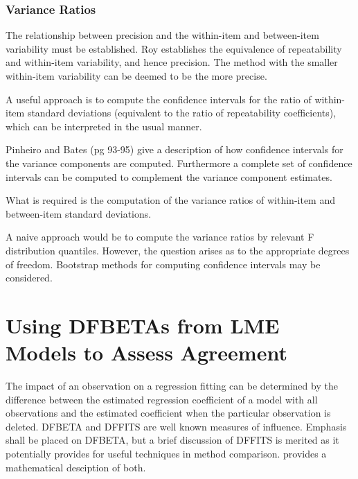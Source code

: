 \documentclass[12pt, a4paper]{report}
\theoremstyle{plain}
\theoremstyle{definition}
\theoremstyle{remark}
\begin{document}
	
	
	
	\subsubsection{Variance Ratios}
	
	The relationship between precision and the within-item and between-item variability must be established. Roy establishes the equivalence of repeatability and within-item variability, and hence precision.  The method with the smaller within-item variability can be deemed to be the more precise.
	
	A useful approach is to compute the confidence intervals for the ratio of within-item standard deviations (equivalent to the ratio of repeatability coefficients), which can be interpreted in the usual manner.
	
	Pinheiro and Bates (pg 93-95) give a description of how confidence intervals for the variance components are computed. Furthermore a complete set of confidence intervals can be computed to complement the variance component estimates.
	
	What is required is the computation of the variance ratios of within-item and between-item standard deviations.
	
	A naive approach would be to compute the variance ratios by relevant F distribution quantiles. However, the question arises as to the appropriate degrees of freedom.
	Bootstrap methods for computing confidence intervals may be considered.
	
	
	
	
	
	
	
	\section{Using DFBETAs from LME Models to Assess Agreement}
	
	The impact of an observation on a regression fitting can be determined by the difference between the estimated regression coefficient of a model with all observations and the estimated coefficient when the particular observation is deleted. DFBETA and DFFITS are well known measures of influence. Emphasis shall be placed on DFBETA, but a brief discussion of DFFITS is merited as it potentially provides for useful techniques in method comparison. \citet{schabenberger} provides a mathematical desciption of both.
	
\end{document}
